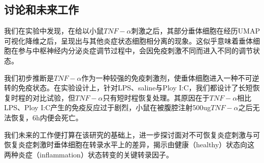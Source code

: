 \subsection{讨论和未来工作}
  我们在实验中发现，在给以小鼠$TNF-\alpha$刺激之后，其部分垂体细胞在经历UMAP可视化降维之后，呈现出与其他炎症状态细胞相分离的现象。这似乎意味着垂体细胞在参与中枢神经内分泌炎症调节过程中，会因免疫刺激不同而进入不同的调节状态。

  我们初步推断是$TNF-\alpha$作为一种较强的免疫刺激剂，使垂体细胞进入一种不可逆转的免疫状态。在实验设计上，针对LPS、saline与Ploy I:C，我们都设计了长短恢复时程的对比试验，但$TNF-\alpha$只有短时程恢复处理。其原因在于$TNF-\alpha$相比LPS、Ploy I:C产生的免疫反应过于剧烈，小鼠在被腹腔注射500ug$TNF-\alpha$之后无法恢复，6h内便会死亡。

  我们未来的工作便打算在该研究的基础上，进一步探讨面对不可恢复炎症刺激与可恢复炎症刺激时垂体细胞在转录水平上的差异，揭示由健康（healthy）状态向这两种炎症（inflammation）状态转变的关键转录因子。

